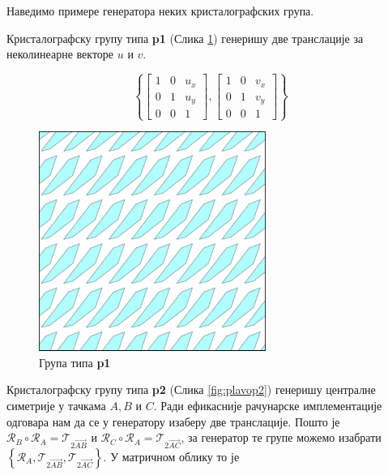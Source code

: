 \documentclass[12pt]{article}
\begin{document}
Наведимо примере генератора неких кристалографских група.





Кристалографску групу типа \textbf{p1}  (Слика \ref{fig:plavop1}) генеришу две транслације за неколинеарне векторе ${u}$ и ${v}$.

$$\left\{\begin{bmatrix}1 & 0 & u_x\\ 0 & 1&u_y \\ 0 & 0 & 1\end{bmatrix},  \begin{bmatrix}1 & 0 & v_x\\ 0 & 1&v_y \\ 0 & 0 & 1\end{bmatrix}\right\} $$

\begin{figure}[H]
\centering
    \includegraphics[width=.3\textwidth]{plavo_p1.png}
    
    \caption{Група типа \textbf{p1}}
    \label{fig:plavop1}
  \end{figure}



Кристалографску групу типа \textbf{p2} (Слика \ref{fig:plavop2}) генеришу централне симетрије у тачкама $A,B$ и $C$. Ради ефикасније рачунарске имплементације одговара нам да се у генератору изаберу две транслације. 
Пошто је $\mathcal{R}_B \circ \mathcal{R}_A = \mathcal{T}_{2\vec{AB}} $ и $\mathcal{R}_C \circ \mathcal{R}_A = \mathcal{T}_{2\vec{AC}} $, за генератор те групе можемо изабрати $\left\{ \mathcal{R}_A , \mathcal{T}_{2\vec{AB}}, \mathcal{T}_{2\vec{AC}} \right\} $. 
У матричном облику то је 
\end{document}
